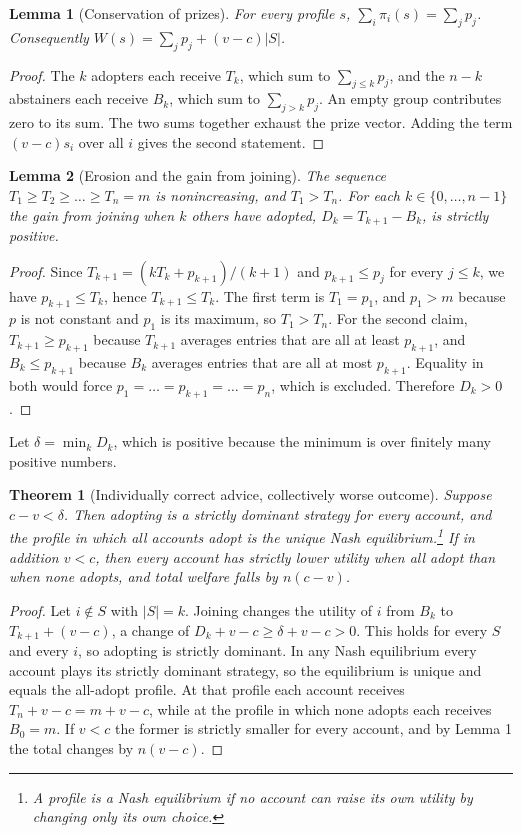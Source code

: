 \documentclass[12pt]{article}
\theoremstyle{plain}
\newtheorem{theorem}{Theorem}
\newtheorem{lemma}{Lemma}
\theoremstyle{definition}
\begin{document}
\begin{lemma}[Conservation of prizes]
For every profile $s$, $\sum_{i}\pi_i(s)=\sum_{j}p_j$. Consequently $W(s)=\sum_j p_j+(v-c)|S|$.
\end{lemma}

\begin{proof}
The $k$ adopters each receive $T_k$, which sum to $\sum_{j\le k}p_j$, and the $n-k$ abstainers each receive $B_k$, which sum to $\sum_{j>k}p_j$. An empty group contributes zero to its sum. The two sums together exhaust the prize vector. Adding the term $(v-c)s_i$ over all $i$ gives the second statement.
\end{proof}

\begin{lemma}[Erosion and the gain from joining]
The sequence $T_1\ge T_2\ge\dots\ge T_n=m$ is nonincreasing, and $T_1>T_n$. For each $k\in\{0,\dots,n-1\}$ the gain from joining when $k$ others have adopted, $D_k=T_{k+1}-B_k$, is strictly positive.
\end{lemma}

\begin{proof}
Since $T_{k+1}=(kT_k+p_{k+1})/(k+1)$ and $p_{k+1}\le p_j$ for every $j\le k$, we have $p_{k+1}\le T_k$, hence $T_{k+1}\le T_k$. The first term is $T_1=p_1$, and $p_1>m$ because $p$ is not constant and $p_1$ is its maximum, so $T_1>T_n$. For the second claim, $T_{k+1}\ge p_{k+1}$ because $T_{k+1}$ averages entries that are all at least $p_{k+1}$, and $B_k\le p_{k+1}$ because $B_k$ averages entries that are all at most $p_{k+1}$. Equality in both would force $p_1=\dots=p_{k+1}=\dots=p_n$, which is excluded. Therefore $D_k>0$.
\end{proof}

Let $\delta=\min_k D_k$, which is positive because the minimum is over finitely many positive numbers.

\begin{theorem}[Individually correct advice, collectively worse outcome]
Suppose $c-v<\delta$. Then adopting is a strictly dominant strategy for every account, and the profile in which all accounts adopt is the unique Nash equilibrium.\footnote{A profile is a Nash equilibrium if no account can raise its own utility by changing only its own choice.} If in addition $v<c$, then every account has strictly lower utility when all adopt than when none adopts, and total welfare falls by $n(c-v)$.
\end{theorem}

\begin{proof}
Let $i\notin S$ with $|S|=k$. Joining changes the utility of $i$ from $B_k$ to $T_{k+1}+(v-c)$, a change of $D_k+v-c\ge \delta+v-c>0$. This holds for every $S$ and every $i$, so adopting is strictly dominant. In any Nash equilibrium every account plays its strictly dominant strategy, so the equilibrium is unique and equals the all-adopt profile. At that profile each account receives $T_n+v-c=m+v-c$, while at the profile in which none adopts each receives $B_0=m$. If $v<c$ the former is strictly smaller for every account, and by Lemma 1 the total changes by $n(v-c)$.
\end{proof}
\end{document}
